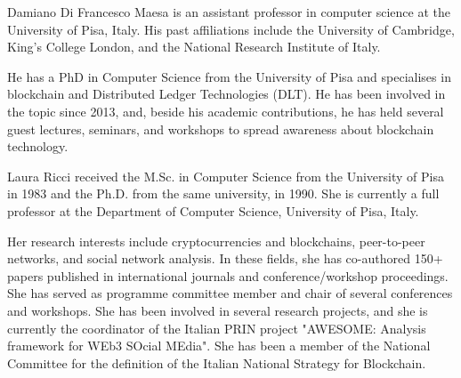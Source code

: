 \documentclass{ieeeaccess}
\begin{document}
\begin{IEEEbiography}{Damiano Di Francesco Maesa} is an assistant professor in computer science at the University of Pisa, Italy. His past affiliations include the University of Cambridge, King's College London, and the National Research Institute of Italy.
    \par
    He has a PhD in Computer Science from the University of Pisa and specialises in blockchain and Distributed Ledger Technologies (DLT). He has been involved in the topic since 2013, and, beside his academic contributions, he has held several guest lectures, seminars, and workshops to spread awareness about blockchain technology.
\end{IEEEbiography}

\begin{IEEEbiography}{Laura Ricci} received the M.Sc. in Computer Science from the University of Pisa in 1983 and the Ph.D. from the same university, in 1990. She is currently a full professor at the Department of Computer Science, University of Pisa, Italy.
    \par
    Her research interests include cryptocurrencies and blockchains, peer-to-peer networks, and social network analysis. In these fields, she has co-authored 150+ papers published in international journals and conference/workshop proceedings. She has served as programme committee member and chair of several conferences and workshops. She has been involved in several research projects, and she is currently the coordinator of the Italian PRIN project "AWESOME: Analysis framework for WEb3 SOcial MEdia". She has been a member of the National Committee for the definition of the Italian National Strategy for Blockchain.
\end{IEEEbiography}

\EOD
\end{document}
